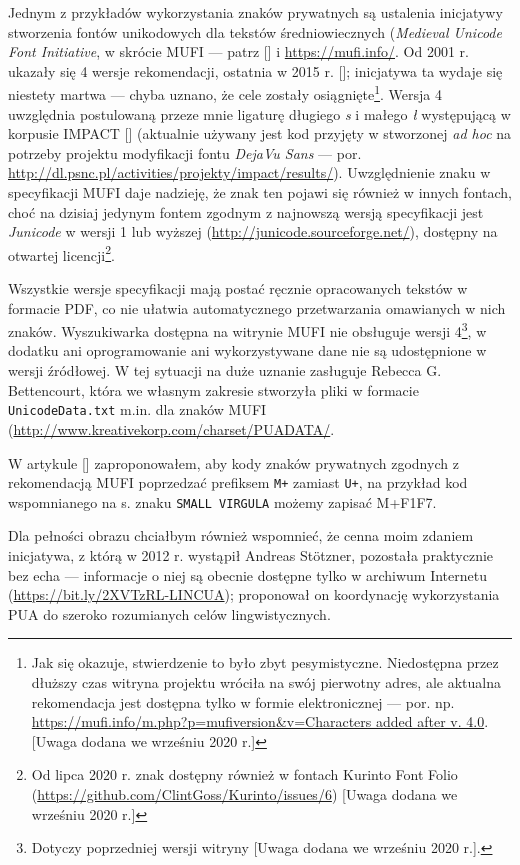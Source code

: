Jednym z przykładów wykorzystania znaków prywatnych są ustalenia
inicjatywy stworzenia fontów unikodowych dla tekstów średniowiecznych
(\textit{Medieval Unicode Font Initiative}, w skrócie MUFI --- patrz
[\cite{einar13:_dealin}] i \url{https://mufi.info/}.
Od 2001 r. ukazały się 4 wersje rekomendacji, ostatnia w 2015
r. [\cite{haugen15:_mufi}]; inicjatywa ta wydaje się niestety martwa
--- chyba uznano, że cele zostały osiągnięte\footnote{Jak się okazuje,
  stwierdzenie to było zbyt pesymistyczne. Niedostępna przez dłuższy
  czas witryna projektu wróciła na swój pierwotny adres, ale aktualna
  rekomendacja jest dostępna tylko w formie elektronicznej ---
  por. np.
  \url{https://mufi.info/m.php?p=mufiversion&v=Characters added after v. 4.0}.
  [Uwaga dodana we wrześniu 2020 r.]}. Wersja 4 uwzględnia postulowaną
przeze mnie ligaturę długiego \textit{s} i małego \textit{ł}
występującą w korpusie IMPACT [\cite{bc381}] (aktualnie używany jest
kod przyjęty w stworzonej \textit{ad hoc} na potrzeby projektu
modyfikacji fontu \textit{DejaVu Sans} ---
por. \url{http://dl.psnc.pl/activities/projekty/impact/results/}). Uwzględnienie
znaku w specyfikacji MUFI daje nadzieję, że znak ten pojawi się
również w innych fontach, choć na dzisiaj jedynym fontem zgodnym z
najnowszą wersją specyfikacji jest \textit{Junicode} w wersji 1 lub
wyższej (\url{http://junicode.sourceforge.net/}), dostępny na otwartej
licencji\footnote{Od lipca 2020 r. znak dostępny również w fontach
  Kurinto Font Folio
  (\url{https://github.com/ClintGoss/Kurinto/issues/6}) [Uwaga dodana we wrześniu 2020 r.]}.

Wszystkie wersje specyfikacji mają postać ręcznie opracowanych tekstów
w formacie PDF, co nie ułatwia automatycznego przetwarzania omawianych
w nich znaków. Wyszukiwarka dostępna na witrynie MUFI nie obsługuje
wersji 4\footnote{Dotyczy poprzedniej wersji witryny [Uwaga dodana we
  wrześniu 2020 r.].}, w dodatku ani oprogramowanie ani wykorzystywane
dane nie są udostępnione w wersji źródłowej. W tej sytuacji na duże
uznanie zasługuje Rebecca G. Bettencourt, która we własnym zakresie
stworzyła pliki w formacie \texttt{UnicodeData.txt} m.in. dla znaków
MUFI (\url{http://www.kreativekorp.com/charset/PUADATA/}.

W artykule [\cite{bc480}] zaproponowałem, aby kody znaków prywatnych
zgodnych z rekomendacją MUFI poprzedzać prefiksem \texttt{M+} zamiast
\texttt{U+}, na przykład kod wspomnianego na s. \pageref{virgula}
znaku \texttt{SMALL VIRGULA} możemy zapisać M+F1F7.

Dla pełności obrazu chciałbym również wspomnieć, że cenna moim zdaniem
inicjatywa, z którą w 2012 r. wystąpił Andreas Stötzner, pozostała
praktycznie bez echa --- informacje o niej są obecnie dostępne tylko w
archiwum Internetu (\url{https://bit.ly/2XVTzRL-LINCUA}); proponował on
koordynację wykorzystania PUA do szeroko rozumianych celów
lingwistycznych.


